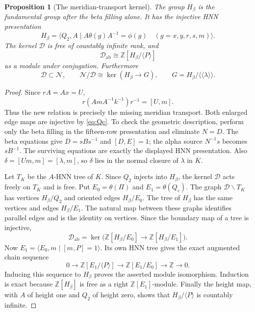 \documentclass[11pt]{amsart}
\newtheorem{proposition}[theorem]{Proposition}
\theoremstyle{definition}
\theoremstyle{remark}
\newcommand{\Z}{\mathbb Z}
\newcommand{\nc}[1]{\langle\!\langle #1\rangle\!\rangle}
\begin{document}
\begin{proposition}[The meridian-transport kernel]\label{prop:transport}
The group $H_\beta$ is the fundamental group after the beta filling
alone. It has the injective HNN presentation
\[
 H_\beta=\langle Q_2,A\mid
 A\theta(g)A^{-1}=\phi(g)\quad(g=x,y,r,s,m)\rangle.
\]
The kernel $\mathcal D$ is free of countably infinite rank, and
\[
 \mathcal D_{\mathrm{ab}}\cong\Z[H_\beta/\langle P\rangle]
\]
as a module under conjugation. Furthermore
\[
 \mathcal D\subset\mathcal N,\qquad
 \mathcal N/\mathcal D\cong\ker(H_\beta\to G),\qquad
 G=H_\beta/\nc\lambda.
\]
\end{proposition}
\begin{proof}
Since $rA=Ax=U$,
\[
 r(AmA^{-1}k^{-1})r^{-1}=[U,m].
\]
Thus the new relation is precisely the missing meridian transport.
Both enlarged edge maps are injective by \eqref{eq:Qc}. To check
the geometric description, perform only the beta filling in the
fifteen-row presentation and eliminate $N=D$. The beta equations
give $D=sBs^{-1}$ and $[D,E]=1$; the alpha source $N^{-1}s$
becomes $sB^{-1}$. The surviving equations are exactly the displayed
HNN presentation. Also $\delta=[Um,m]=[\lambda,m]$, so
$\delta$ lies in the normal closure of $\lambda$ in $K$.

Let $T_K$ be the $A$-HNN tree of $K$. Since $Q_2$ injects into
$H_\beta$, the kernel $\mathcal D$ acts freely on $T_K$ and is
free. Put $E_0=\theta(\Pi)$ and $E_1=\theta(Q_c)$. The graph
$\mathcal D\backslash T_K$ has vertices $H_\beta/Q_2$ and
oriented edges $H_\beta/E_0$. The tree of $H_\beta$ has the same
vertices and edges $H_\beta/E_1$. The natural map between these
graphs identifies parallel edges and is the identity on vertices.
Since the boundary map of a tree is injective,
\[
 \mathcal D_{\mathrm{ab}}
 =\ker\bigl(\Z[H_\beta/E_0]\longrightarrow
                    \Z[H_\beta/E_1]\bigr).
\]
Now $E_1=\langle E_0,m\mid[m,P]=1\rangle$. Its own HNN tree
gives the exact augmented chain sequence
\[
 0\longrightarrow\Z[E_1/\langle P\rangle]
 \longrightarrow\Z[E_1/E_0]\longrightarrow\Z\longrightarrow0.
\]
Inducing this sequence to $H_\beta$ proves the asserted module
isomorphism. Induction is exact because $\Z[H_\beta]$ is free
as a right $\Z[E_1]$-module. Finally the height map, with $A$
of height one and $Q_2$ of height zero, shows that
$H_\beta/\langle P\rangle$ is countably infinite.
\end{proof}
\end{document}

